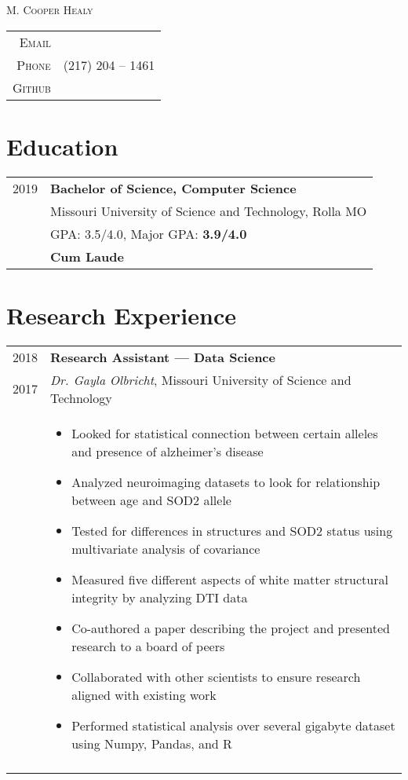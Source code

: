 \documentclass[a4paper,10pt]{article}
\newcommand{\lmline}[1]{%
  \uline{\phantom{#1}}%
  \llap{\contour{white}{#1}}%
}
\newcommand{\br}{\\\multicolumn{2}{c}{}}
\begin{document}
\pagestyle{empty}

\par{\centering
    {\Huge \textsc{M. Cooper Healy}
}\bigskip\par}

\begin{center}
\begin{tabular}{rl}
    \textsc{Email }        & \lmline{m.cooper.healy@gmail.com} \\
    \textsc{Phone }        & (217) 204 -- 1461  \\
    \textsc{Github }       & \lmline{https://github.com/noonels} \\
\end{tabular}
\end{center}

\section{Education}
\begin{tabular}{r p{15cm}}
  \textsc{2019} & \textbf{Bachelor of Science, Computer Science} \\
                & Missouri University of Science and Technology, Rolla MO  \\
                & GPA: 3.5/4.0, Major GPA: \textbf{3.9/4.0} \\
                & \textbf{Cum Laude} \\
\end{tabular}

\section{Research Experience}
\begin{tabular}{r p{15cm}}
    \textsc{2018} & \textbf{Research Assistant --- Data Science} \\
    \textsc{2017} & \textit{Dr. Gayla Olbricht}, Missouri University of Science and Technology \\ &
    \begin{itemize}
    \item Looked for statistical connection between certain alleles and presence of alzheimer's disease
    \item Analyzed neuroimaging datasets to look for relationship between age and SOD2 allele
    \item Tested for differences in structures and SOD2 status using multivariate analysis of covariance
    \item Measured five different aspects of white matter structural integrity by analyzing DTI data
    \item Co-authored a paper describing the project and presented research to a board of peers
    \item Collaborated with other scientists to ensure research aligned with existing work
    \item Performed statistical analysis over several gigabyte dataset using Numpy, Pandas, and R
    \end{itemize} \br\\

\end{tabular}
\end{document}
